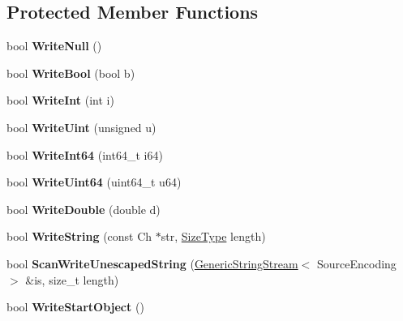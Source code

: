 \subsection*{Protected Member Functions}
\begin{DoxyCompactItemize}
\item 
bool {\bfseries Write\+Null} ()\hypertarget{a00335_a44862b3eba8d84b909c69aba875c9f4d}{}\label{a00335_a44862b3eba8d84b909c69aba875c9f4d}

\item 
bool {\bfseries Write\+Bool} (bool b)\hypertarget{a00335_a42ad68b6950431bb8ca0199568546eaf}{}\label{a00335_a42ad68b6950431bb8ca0199568546eaf}

\item 
bool {\bfseries Write\+Int} (int i)\hypertarget{a00335_a31d0feda654ca245c41462be7dc59998}{}\label{a00335_a31d0feda654ca245c41462be7dc59998}

\item 
bool {\bfseries Write\+Uint} (unsigned u)\hypertarget{a00335_a2861227e93707d1478d2cf56644dca3b}{}\label{a00335_a2861227e93707d1478d2cf56644dca3b}

\item 
bool {\bfseries Write\+Int64} (int64\+\_\+t i64)\hypertarget{a00335_aa58d3f80c06394648de5055ecfb41587}{}\label{a00335_aa58d3f80c06394648de5055ecfb41587}

\item 
bool {\bfseries Write\+Uint64} (uint64\+\_\+t u64)\hypertarget{a00335_ad07b325157220e3aa791c1c8c904021e}{}\label{a00335_ad07b325157220e3aa791c1c8c904021e}

\item 
bool {\bfseries Write\+Double} (double d)\hypertarget{a00335_ae7a0fc4740681d845d92c1213bd25aa1}{}\label{a00335_ae7a0fc4740681d845d92c1213bd25aa1}

\item 
bool {\bfseries Write\+String} (const Ch $\ast$str, \hyperlink{a00677_a5ed6e6e67250fadbd041127e6386dcb5}{Size\+Type} length)\hypertarget{a00335_acda4412ef5f4cac6e89f9544e4b10f70}{}\label{a00335_acda4412ef5f4cac6e89f9544e4b10f70}

\item 
bool {\bfseries Scan\+Write\+Unescaped\+String} (\hyperlink{a00129}{Generic\+String\+Stream}$<$ Source\+Encoding $>$ \&is, size\+\_\+t length)\hypertarget{a00335_a94140803bba7863a1b39c936bbe6d262}{}\label{a00335_a94140803bba7863a1b39c936bbe6d262}

\item 
bool {\bfseries Write\+Start\+Object} ()\hypertarget{a00335_a81c72a2eecd47e042f56ca93a27a5cb1}{}\label{a00335_a81c72a2eecd47e042f56ca93a27a5cb1}


\end{DoxyCompactItemize}

